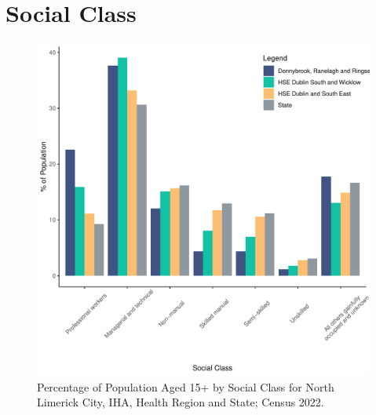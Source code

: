 \documentclass{article}
\begin{document}
\section{Social Class}\label{sect:SC}
\begin{figure}[H]
	\centering
	\includegraphics[width = 140mm]{../figures/SocialClassED.pdf}
	\caption{Percentage of Population Aged 15+ by Social Class for North Limerick City, IHA, Health Region and State; Census 2022.}
	\label{fig:vbnv}
	\end{figure}
\end{document}
